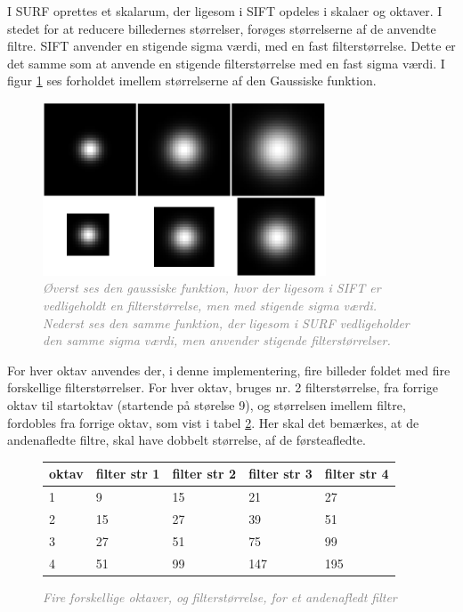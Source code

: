 I SURF oprettes et skalarum, der ligesom i SIFT opdeles i skalaer og oktaver. I stedet for at reducere billedernes størrelser, forøges størrelserne af de anvendte filtre. SIFT anvender en stigende sigma værdi, med en fast filterstørrelse. Dette er det samme som at anvende en stigende filterstørrelse med en fast sigma værdi. I figur \ref{fig:siftsurf} ses forholdet imellem størrelserne af den Gaussiske funktion.
\begin{figure}[H]
    \centering
    \includegraphics[width=0.75\textwidth]{fig/34.png}
     \vspace{-0.5em}
    \begin{center}    
       \caption{\textcolor{gray}{\footnotesize \textit{Øverst ses den gaussiske funktion, hvor der ligesom i SIFT er vedligeholdt en filterstørrelse, men med stigende sigma værdi. Nederst ses den samme funktion, der ligesom i SURF vedligeholder den samme sigma værdi, men anvender stigende filterstørrelser.}}}
    \label{fig:siftsurf}
     \end{center}
     \vspace{-1.5em}
  \end{figure} \noindent
For hver oktav anvendes der, i denne implementering, fire billeder foldet med fire forskellige filterstørrelser. For hver oktav, bruges nr. 2 filterstørrelse, fra forrige oktav til startoktav (startende på størelse 9), og størrelsen imellem filtre, fordobles fra forrige oktav, som vist i tabel \ref{fig:secderivfiltersize}. Her skal det bemærkes, at de andenafledte filtre, skal have dobbelt størrelse, af de førsteafledte.
\begin{figure}[H]
    \centering
    \begin{center}    
    \begin{tabular}{ | l | l | l | l | l |}
    \hline
    oktav & filter str 1 & filter str 2 & filter str 3 & filter str 4 \\ \hline
    1 & 9 & 15 & 21 & 27 \\ \hline
  	2 & 15 & 27 & 39 & 51 \\ \hline
  	3 & 27 & 51 & 75 & 99 \\ \hline
  	4 & 51 & 99 & 147 & 195 \\ \hline
    \end{tabular}       
    \caption{\textcolor{gray}{\footnotesize \textit{Fire forskellige oktaver, og filterstørrelse, for et andenafledt filter}}}
    \label{fig:secderivfiltersize}
     \end{center}
     \vspace{-2.5em}
  \end{figure} \noindent
